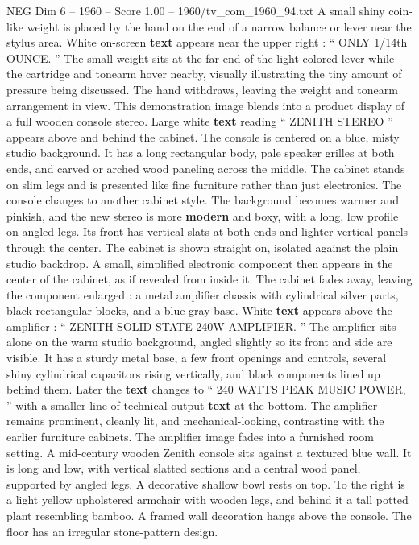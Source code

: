 \begin{textsample}{NEG Dim 6 – 1960 – Score 1.00 – 1960/tv\_com\_1960\_94.txt}
A small shiny coin-like weight is placed by the hand on the end of a narrow balance or lever near the stylus area.
White on-screen \textbf{text} appears near the upper right : “ ONLY 1/14th OUNCE. ” The small weight sits at the far end of the light-colored lever while the cartridge and tonearm hover nearby, visually illustrating the tiny amount of pressure being discussed.
The hand withdraws, leaving the weight and tonearm arrangement in view.
This demonstration image blends into a product display of a full wooden console stereo.
Large white \textbf{text} reading “ ZENITH STEREO ” appears above and behind the cabinet.
The console is centered on a blue, misty studio background.
It has a long rectangular body, pale speaker grilles at both ends, and carved or arched wood paneling across the middle.
The cabinet stands on slim legs and is presented like fine furniture rather than just electronics.
The console changes to another cabinet style.
The background becomes warmer and pinkish, and the new stereo is more \textbf{modern} and boxy, with a long, low profile on angled legs.
Its front has vertical slats at both ends and lighter vertical panels through the center.
The cabinet is shown straight on, isolated against the plain studio backdrop.
A small, simplified electronic component then appears in the center of the cabinet, as if revealed from inside it.
The cabinet fades away, leaving the component enlarged : a metal amplifier chassis with cylindrical silver parts, black rectangular blocks, and a blue-gray base.
White \textbf{text} appears above the amplifier : “ ZENITH SOLID STATE 240W AMPLIFIER. ” The amplifier sits alone on the warm studio background, angled slightly so its front and side are visible.
It has a sturdy metal base, a few front openings and controls, several shiny cylindrical capacitors rising vertically, and black components lined up behind them.
Later the \textbf{text} changes to “ 240 WATTS PEAK MUSIC POWER, ” with a smaller line of technical output \textbf{text} at the bottom.
The amplifier remains prominent, cleanly lit, and mechanical-looking, contrasting with the earlier furniture cabinets.
The amplifier image fades into a furnished room setting.
A mid-century wooden Zenith console sits against a textured blue wall.
It is long and low, with vertical slatted sections and a central wood panel, supported by angled legs.
A decorative shallow bowl rests on top.
To the right is a light yellow upholstered armchair with wooden legs, and behind it a tall potted plant resembling bamboo.
A framed wall decoration hangs above the console.
The floor has an irregular stone-pattern design.

\end{textsample}
